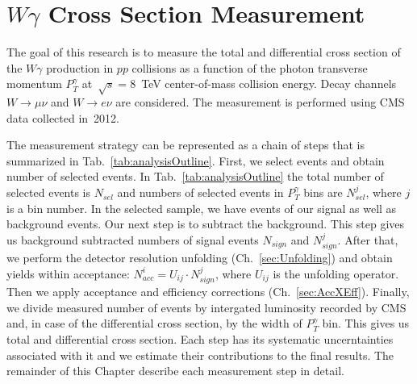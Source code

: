 \chapter{$W\gamma$ Cross Section Measurement}
\label{sec:AN_WgMeas}

The goal of this research is to measure the total and differential cross section of the $W\gamma$ production in $pp$ collisions as a function of the photon transverse momentum $P_T^\gamma$ at~$\sqrt{s}=8$~TeV center-of-mass collision energy. Decay channels $W\rightarrow\mu\nu$ and $W\rightarrow e\nu$ are considered. The measurement is performed using CMS data collected in~2012.

The measurement strategy can be represented as a chain of steps that is summarized in Tab.~\ref{tab:analysisOutline}. First, we select events and obtain number of selected events. In Tab.~\ref{tab:analysisOutline} the total number of selected events is $N_{sel}$ and numbers of selected events in $P_T^{\gamma}$ bins are $N_{sel}^j$, where $j$ is a bin number. In the selected sample, we have events of our signal as well as background events. Our next step is to subtract the background. This step gives us background subtracted numbers of signal events $N_{sign}$ and $N_{sign}^j$. After that, we perform the detector resolution unfolding (Ch.~\ref{sec:Unfolding}) and obtain yields within acceptance: $N_{acc}^i = U_{ij} \cdot N_{sign}^j$, where $U_{ij}$ is the unfolding operator. Then we apply acceptance and efficiency corrections (Ch.~\ref{sec:AccXEff}). Finally, we divide measured number of events by intergated luminosity recorded by CMS and, in case of the differential cross section, by the width of $P_T^{\gamma}$ bin. This gives us total and differential cross section. Each step has its systematic uncerntainties associated with it and we estimate their contributions to the final results. The remainder of this Chapter describe each measurement step in detail.

